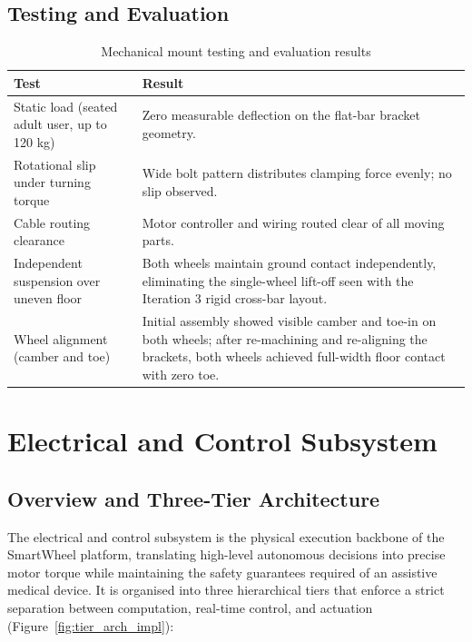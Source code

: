 \documentclass[12pt,a4paper]{report}
\begin{document}
\subsection{Testing and Evaluation}

\begin{table}[H]
\centering
\caption{Mechanical mount testing and evaluation results}
\label{tab:mech_testing}
\begin{tabularx}{\textwidth}{@{}lX@{}}
\toprule
\rowcolor{rafblue!12}
\textbf{Test} & \textbf{Result} \\
\midrule
Static load (seated adult user, up to 120 kg) & Zero measurable deflection
on the flat-bar bracket geometry. \\
\addlinespace
Rotational slip under turning torque & Wide bolt pattern distributes
clamping force evenly; no slip observed. \\
\addlinespace
Cable routing clearance & Motor controller and wiring routed clear of all
moving parts. \\
\addlinespace
Independent suspension over uneven floor & Both wheels maintain ground
contact independently, eliminating the single-wheel lift-off seen with the
Iteration 3 rigid cross-bar layout. \\
\addlinespace
Wheel alignment (camber and toe) & Initial assembly showed visible camber
and toe-in on both wheels; after re-machining and re-aligning the brackets,
both wheels achieved full-width floor contact with zero toe. \\
\bottomrule
\end{tabularx}
\end{table}




\section{Electrical and Control Subsystem}
\label{sec:electrical_control}

\subsection{Overview and Three-Tier Architecture}
\label{sec:ec_overview_impl}

The electrical and control subsystem is the physical execution backbone of the
SmartWheel platform, translating high-level autonomous decisions into precise
motor torque while maintaining the safety guarantees required of an assistive
medical device. It is organised into three hierarchical tiers that enforce a
strict separation between computation, real-time control, and actuation
(Figure~\ref{fig:tier_arch_impl}):
\end{document}
